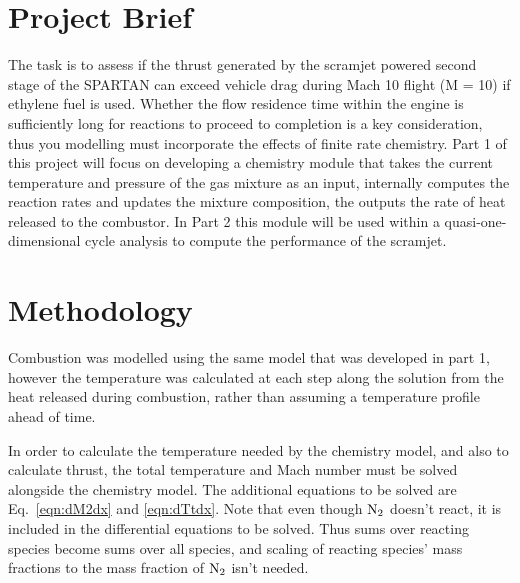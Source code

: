 \documentclass[a4paper]{article}
\begin{document}
\section{Project Brief}
The task is to assess if the thrust generated by the scramjet powered second stage of the SPARTAN can exceed vehicle drag during Mach 10 flight (M = 10) if ethylene fuel is used. Whether the flow residence time within the engine is sufficiently long for reactions to proceed to completion is a key consideration, thus you modelling must incorporate the effects of finite rate chemistry. Part 1 of this project will focus on developing a chemistry module that takes the current temperature and pressure of the gas mixture as an input, internally computes the reaction rates and updates the mixture composition, the outputs the rate of heat released to the combustor. In Part 2 this module will be used within a quasi-one-dimensional cycle analysis to compute the performance of the scramjet.

\section{Methodology}\label{sec:methodology}
Combustion was modelled using the same model that was developed in part 1, however the temperature was calculated at each step along the solution from the heat released during combustion, rather than assuming a temperature profile ahead of time.

In order to calculate the temperature needed by the chemistry model, and also to calculate thrust, the total temperature and Mach number must be solved alongside the chemistry model. The additional equations to be solved are Eq.~\ref{eqn:dM2dx} and \ref{eqn:dTtdx}. Note that even though \(\ce{N2}\) doesn't react, it is included in the differential equations to be solved. Thus sums over reacting species become sums over all species, and scaling of reacting species' mass fractions to the mass fraction of \(\ce{N2}\) isn't needed.
\end{document}
